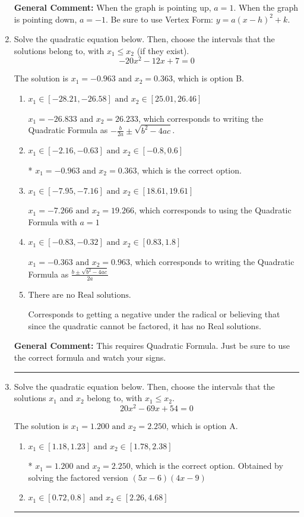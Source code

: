 \documentclass{extbook}[14pt]
\newcommand{\litem}[1]{\item #1

\rule{\textwidth}{0.4pt}}
\begin{document}
\begin{enumerate}
{\textbf{General Comment:} When the graph is pointing up, $a=1$. When the graph is pointing down, $a=-1$. Be sure to use Vertex Form: $y = a(x-h)^2+k$.
}
\litem{
Solve the quadratic equation below. Then, choose the intervals that the solutions belong to, with $x_1 \leq x_2$ (if they exist).
\[ -20x^{2} -12 x + 7 = 0 \]

The solution is \( x_1 = -0.963 \text{ and } x_2 = 0.363 \), which is option B.\begin{enumerate}[label=\Alph*.]
\item \( x_1 \in [-28.21, -26.58] \text{ and } x_2 \in [25.01, 26.46] \)

 $x_1 = -26.833 \text{ and } x_2 = 26.233$, which corresponds to writing the Quadratic Formula as $-\frac{b}{2a} \pm \sqrt{b^2 - 4ac}$.
\item \( x_1 \in [-2.16, -0.63] \text{ and } x_2 \in [-0.8, 0.6] \)

* $x_1 = -0.963 \text{ and } x_2 = 0.363$, which is the correct option.
\item \( x_1 \in [-7.95, -7.16] \text{ and } x_2 \in [18.61, 19.61] \)

 $x_1 = -7.266 \text{ and } x_2 = 19.266$, which corresponds to using the Quadratic Formula with $a=1$
\item \( x_1 \in [-0.83, -0.32] \text{ and } x_2 \in [0.83, 1.8] \)

 $x_1 = -0.363 \text{ and } x_2 = 0.963$, which corresponds to writing the Quadratic Formula as $\frac{b \pm \sqrt{b^2 - 4ac}}{2a}$
\item \( \text{There are no Real solutions.} \)

Corresponds to getting a negative under the radical or believing that since the quadratic cannot be factored, it has no Real solutions.
\end{enumerate}

\textbf{General Comment:} This requires Quadratic Formula. Just be sure to use the correct formula and watch your signs.
}
\litem{
Solve the quadratic equation below. Then, choose the intervals that the solutions $x_1$ and $x_2$ belong to, with $x_1 \leq x_2$.
\[ 20x^{2} -69 x + 54 = 0 \]

The solution is \( x_1 = 1.200 \text{ and } x_2 = 2.250 \), which is option A.\begin{enumerate}[label=\Alph*.]
\item \( x_1 \in [1.18, 1.23] \text{ and } x_2 \in [1.78, 2.38] \)

* $x_1 = 1.200 \text{ and } x_2 = 2.250$, which is the correct option. Obtained by solving the factored version $(5x -6)(4x -9)$
\item \( x_1 \in [0.72, 0.8] \text{ and } x_2 \in [2.26, 4.68] \)


\end{enumerate}}
\end{enumerate}
\end{document}
